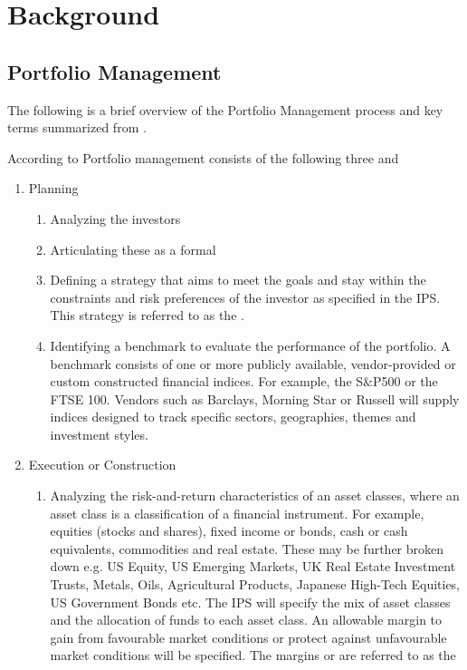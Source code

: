 \documentclass[oneside,12pt]{Classes/RoboticsLaTeX}
\begin{document}
\chapter{Background}
\label{chap:backg}
\section{Portfolio Management} \label{section:portfolio management}
The following is a brief overview of the Portfolio Management process and key terms summarized from \citet{BakerH.Kent2013PTaM}.

According to \citet{BakerH.Kent2013PTaM} Portfolio management consists of the following three  and 
\begin{enumerate}
\item Planning \citep[p.2]{BakerH.Kent2013PTaM}
    \begin{enumerate}
    \item Analyzing the investors 
    \item Articulating these as a formal 
    \item Defining a strategy that aims to meet the goals and stay within the constraints and risk preferences of the investor as specified in the IPS. This strategy is referred to as the . 
    \item Identifying a benchmark to evaluate the performance of the portfolio. A benchmark consists of one or more publicly available, vendor-provided or custom constructed financial indices.  For example, the S\&P500 or the FTSE 100. Vendors such as Barclays, Morning Star or Russell will supply indices designed to track specific sectors, geographies, themes and investment styles.
    \end{enumerate}
\item Execution or Construction \citep[p.2-3]{BakerH.Kent2013PTaM}
    \begin{enumerate}
    \item Analyzing the risk-and-return characteristics of an asset classes, where an asset class is a classification of a financial instrument.  For example, equities (stocks and shares), fixed income or bonds, cash or cash equivalents, commodities and real estate. These may be further broken down e.g. US Equity, US Emerging Markets, UK Real Estate Investment Trusts, Metals, Oils, Agricultural Products, Japanese High-Tech Equities, US Government Bonds etc.  The IPS will specify the mix of asset classes and the allocation of funds to each asset class. An allowable margin to gain from favourable market conditions or protect against unfavourable market conditions will be specified. The margins or  are referred to as the 

\end{enumerate}
\end{enumerate}
\end{document}
